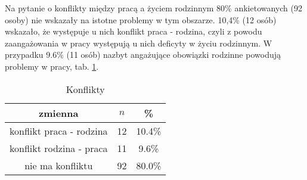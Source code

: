 Na pytanie o konflikty między pracą a życiem rodzinnym 80\% ankietowanych (92 osoby) nie wskazały na istotne problemy w tym obszarze. 10,4\% (12 osób) wskazało, że występuje u nich konflikt praca - rodzina, czyli z powodu zaangażowania w pracy występują u nich deficyty w życiu rodzinnym. W przypadku 9.6\% (11 osób) nazbyt angażujące obowiązki rodzinne powodują problemy w pracy, tab. \ref{tab:Q27}.

\begin{table}[H]
\caption{Konflikty}
\centering
\begin{tabular}{ | c | c | c |}
\hline
zmienna & $n$ & \% \\
\hline
konflikt praca - rodzina  &  12  & 10.4\% \\
\hline
konflikt rodzina - praca  &  11  & 9.6\% \\
\hline
nie ma konfliktu  &  92  & 80.0\% \\
\hline
\end{tabular}
\label{tab:Q27}
\end{table}
